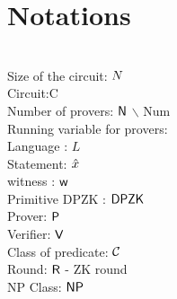 \section{Notations}
\\
Size of the circuit: $N$\\
Circuit:C\\
Number of provers: $\mathsf{N}$ $\backslash$ Num\\
Running variable for provers:\\
Language : $L$\\
Statement: $\hat{x}$\\
witness : $\mathsf{w}$\\
Primitive DPZK : $\mathsf{DPZK}$\\
Prover: $\mathsf{P}$\\
Verifier: $\mathsf{V}$\\
Class of predicate: ${\mathcal{C}}$\\
Round: $\mathsf{R}$ - ZK round\\
NP Class: $\mathsf{NP}$\\